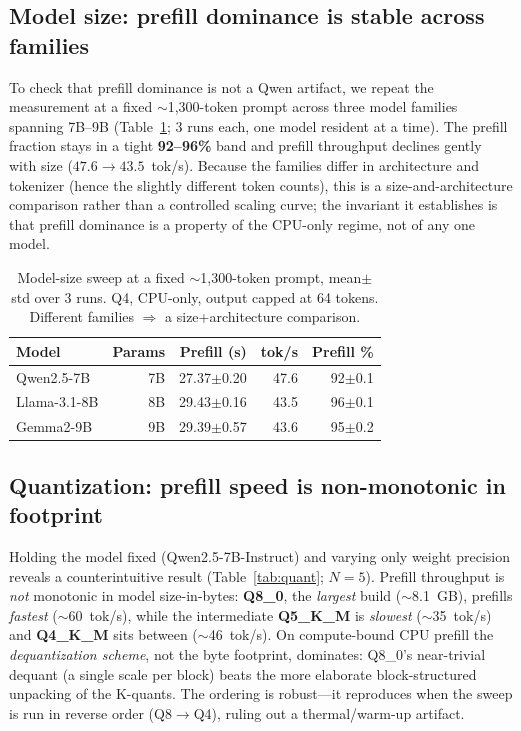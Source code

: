 \documentclass[10pt,twocolumn]{article}
\begin{document}
\subsection{Model size: prefill dominance is stable across families}
\label{sec:results-size}
To check that prefill dominance is not a Qwen artifact, we repeat the
measurement at a fixed $\sim$1{,}300-token prompt across three model
families spanning 7B--9B (Table~\ref{tab:modelsize}; 3 runs each, one model
resident at a time). The prefill fraction stays in a tight
\textbf{92--96\%} band and prefill throughput declines gently with size
($47.6\rightarrow43.5$~tok/s). Because the families differ in architecture
and tokenizer (hence the slightly different token counts), this is a
size-and-architecture comparison rather than a controlled scaling curve;
the invariant it establishes is that prefill dominance is a property of the
CPU-only regime, not of any one model.

\begin{table}[t]
  \centering
  \caption{Model-size sweep at a fixed $\sim$1{,}300-token prompt,
  mean$\pm$std over 3 runs. Q4, CPU-only, output capped at 64 tokens.
  Different families $\Rightarrow$ a size+architecture comparison.}
  \label{tab:modelsize}
  \small
  \begin{tabular}{lrrrr}
    \toprule
    Model & Params & Prefill (s) & tok/s & Prefill \% \\
    \midrule
    Qwen2.5-7B   & 7B & 27.37$\pm$0.20 & 47.6 & 92$\pm$0.1 \\
    Llama-3.1-8B & 8B & 29.43$\pm$0.16 & 43.5 & 96$\pm$0.1 \\
    Gemma2-9B    & 9B & 29.39$\pm$0.57 & 43.6 & 95$\pm$0.2 \\
    \bottomrule
  \end{tabular}
\end{table}

\subsection{Quantization: prefill speed is non-monotonic in footprint}
\label{sec:results-quant}
Holding the model fixed (Qwen2.5-7B-Instruct) and varying only weight
precision reveals a counterintuitive result (Table~\ref{tab:quant};
$N{=}5$). Prefill throughput is \emph{not} monotonic in model
size-in-bytes: \textbf{Q8\_0}, the \emph{largest} build ($\sim$8.1~GB),
prefills \emph{fastest} ($\sim$60~tok/s), while the intermediate
\textbf{Q5\_K\_M} is \emph{slowest} ($\sim$35~tok/s) and \textbf{Q4\_K\_M}
sits between ($\sim$46~tok/s). On compute-bound CPU prefill the
\emph{dequantization scheme}, not the byte footprint, dominates: Q8\_0's
near-trivial dequant (a single scale per block) beats the more elaborate
block-structured unpacking of the K-quants. The ordering is robust---it
reproduces when the sweep is run in reverse order (Q8${\to}$Q4), ruling out
a thermal/warm-up artifact.
\end{document}
